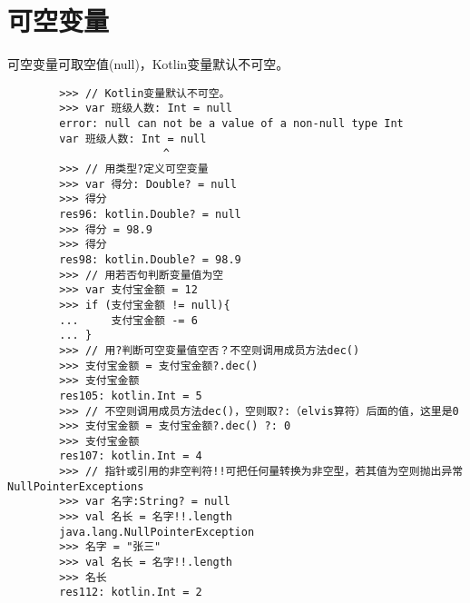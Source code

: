 \section{可空变量}
可空变量可取空值(null)，Kotlin变量默认不可空。
    \begin{verbatim}
        >>> // Kotlin变量默认不可空。
        >>> var 班级人数: Int = null
        error: null can not be a value of a non-null type Int
        var 班级人数: Int = null
                        ^
        >>> // 用类型?定义可空变量
        >>> var 得分: Double? = null
        >>> 得分
        res96: kotlin.Double? = null
        >>> 得分 = 98.9
        >>> 得分
        res98: kotlin.Double? = 98.9
        >>> // 用若否句判断变量值为空
        >>> var 支付宝金额 = 12
        >>> if (支付宝金额 != null){
        ...     支付宝金额 -= 6
        ... }
        >>> // 用?判断可空变量值空否？不空则调用成员方法dec()
        >>> 支付宝金额 = 支付宝金额?.dec()
        >>> 支付宝金额
        res105: kotlin.Int = 5
        >>> // 不空则调用成员方法dec()，空则取?:（elvis算符）后面的值，这里是0
        >>> 支付宝金额 = 支付宝金额?.dec() ?: 0
        >>> 支付宝金额
        res107: kotlin.Int = 4
        >>> // 指针或引用的非空判符!!可把任何量转换为非空型，若其值为空则抛出异常NullPointerExceptions
        >>> var 名字:String? = null
        >>> val 名长 = 名字!!.length
        java.lang.NullPointerException
        >>> 名字 = "张三"
        >>> val 名长 = 名字!!.length
        >>> 名长
        res112: kotlin.Int = 2

    \end{verbatim}

